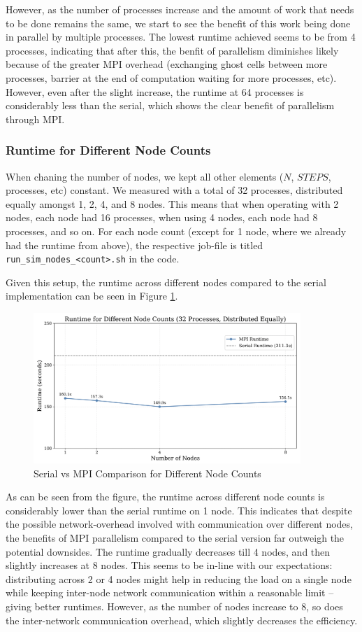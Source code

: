 \documentclass[a4paper,10pt]{article}
\begin{document}
However, as the number of processes increase and the amount of work that needs to be done remains the same, we start to see the benefit of this work being done in parallel by multiple processes. The lowest runtime achieved seems to be from 4 processes, indicating that after this, the benfit of parallelism diminishes likely because of the greater MPI overhead (exchanging ghost cells between more processes, barrier at the end of computation waiting for more processes, etc). However, even after the slight increase, the runtime at 64 processes is considerably less than the serial, which shows the clear benefit of parallelism through MPI. 

\subsubsection{Runtime for Different Node Counts}
When chaning the number of nodes, we kept all other elements ($N$, $STEPS$, processes, etc) constant. We measured with a total of 32 processes, distributed equally amongst 1, 2, 4, and 8 nodes. This means that when operating with 2 nodes, each node had 16 processes, when using 4 nodes, each node had 8 processes, and so on. For each node count (except for 1 node, where we already had the runtime from above), the respective job-file is titled \verb|run_sim_nodes_<count>.sh| in the code. 

Given this setup, the runtime across different nodes compared to the serial implementation can be seen in Figure \ref{fig:ex1_node_counts}.
\begin{figure}[H]
  \centering
  \includegraphics[width=0.9\textwidth]{img/ex1/diff_node_counts}
  \caption{Serial vs MPI Comparison for Different Node Counts}
  \label{fig:ex1_node_counts}
\end{figure}

As can be seen from the figure, the runtime across different node counts is considerably lower than the serial runtime on 1 node. This indicates that despite the possible network-overhead involved with communication over different nodes, the benefits of MPI parallelism compared to the serial version far outweigh the potential downsides. The runtime gradually decreases till 4 nodes, and then slightly increases at 8 nodes. This seems to be in-line with our expectations: distributing across 2 or 4 nodes might help in reducing the load on a single node while keeping inter-node network communication within a reasonable limit -- giving better runtimes. However, as the number of nodes increase to 8, so does the inter-network communication overhead, which slightly decreases the efficiency. 
\end{document}

